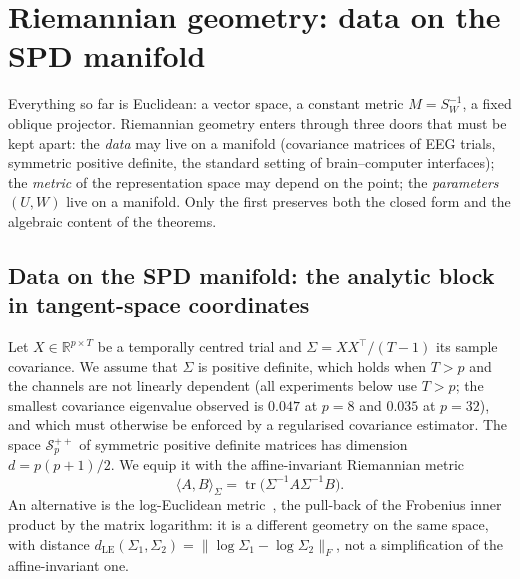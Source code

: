 \documentclass[11pt,a4paper]{article}
\theoremstyle{plain}
\theoremstyle{definition}
\theoremstyle{remark}
\newcommand{\R}{\mathbb R}
\newcommand{\tr}{\operatorname{tr}}
\newcommand{\T}{\top}
\begin{document}
\section{Riemannian geometry: data on the SPD manifold}
\label{sec:riemann}
Everything so far is Euclidean: a vector space, a constant metric
$M=S_W^{-1}$, a fixed oblique projector. Riemannian geometry enters through
three doors that must be kept apart: the \emph{data} may live on a manifold
(covariance matrices of EEG trials, symmetric positive definite, the standard
setting of brain--computer interfaces); the \emph{metric} of the
representation space may depend on the point; the \emph{parameters} $(U,W)$
live on a manifold. Only the first preserves both the closed form and the
algebraic content of the theorems.

\subsection{Data on the SPD manifold: the analytic block in tangent-space coordinates}
Let $X\in\R^{p\times T}$ be a temporally centred trial and
$\Sigma=XX^\T/(T-1)$ its sample covariance. We assume that $\Sigma$ is
positive definite, which holds when $T>p$ and the channels are not linearly
dependent (all experiments below use $T>p$; the smallest covariance
eigenvalue observed is $0.047$ at $p=8$ and $0.035$ at $p=32$), and which
must otherwise be enforced by a regularised covariance estimator. The space
$\mathcal S^{++}_p$ of symmetric positive definite matrices has dimension
$d=p(p+1)/2$. We equip it with the affine-invariant Riemannian
metric~\cite{pennec2006}
\[
  \langle A,B\rangle_\Sigma=\tr\bigl(\Sigma^{-1}A\Sigma^{-1}B\bigr).
\]
An alternative is the log-Euclidean metric~\cite{arsigny2006}, the pull-back
of the Frobenius inner product by the matrix logarithm: it is a different
geometry on the same space, with distance
$d_{\mathrm{LE}}(\Sigma_1,\Sigma_2)=\|\log\Sigma_1-\log\Sigma_2\|_F$, not a
simplification of the affine-invariant one.
\end{document}
